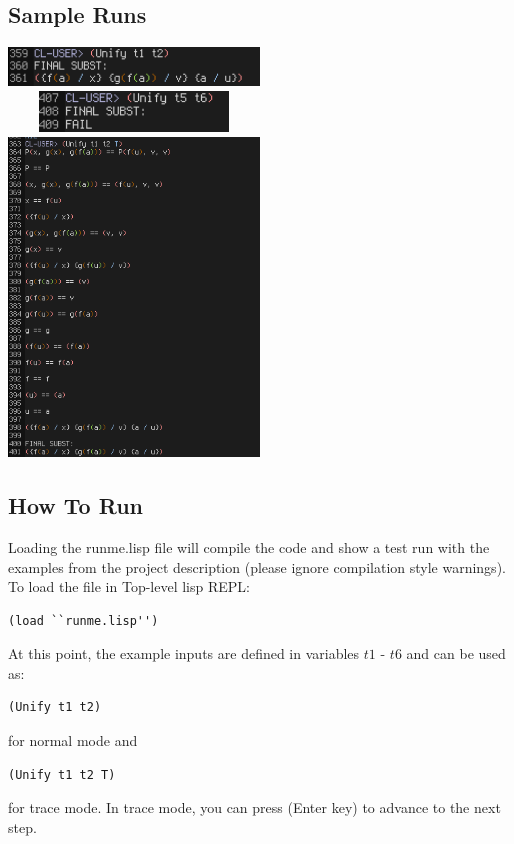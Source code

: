 \documentclass[paper=a4, fontsize=11pt]{scrartcl}
\numberwithin{equation}{section}		%
\numberwithin{figure}{section}			%
\numberwithin{table}{section}				%
\begin{document}
\subsection{Sample Runs}
\includegraphics[width=0.5\textwidth]{unfiy.png}
\includegraphics[width=0.5\textwidth, height=1.1cm]{unify-fail.png}
\includegraphics[width=0.5\textwidth]{trace-unify.png}

\subsection{How To Run}
Loading the runme.lisp file will compile the code and show a test run with the
examples from the project description (please ignore compilation style warnings).
To load the file in Top-level lisp REPL: \\
\begin{lstlisting}
(load ``runme.lisp'')
\end{lstlisting}
At this point, the example inputs are defined in variables $t1$ - $t6$ and can be
used as:
\begin{lstlisting}
(Unify t1 t2)
\end{lstlisting}
for normal mode and 
\begin{lstlisting}
(Unify t1 t2 T)
\end{lstlisting}
for trace mode. In trace mode, you can press (Enter key) to advance to the next
step.
\end{document}
